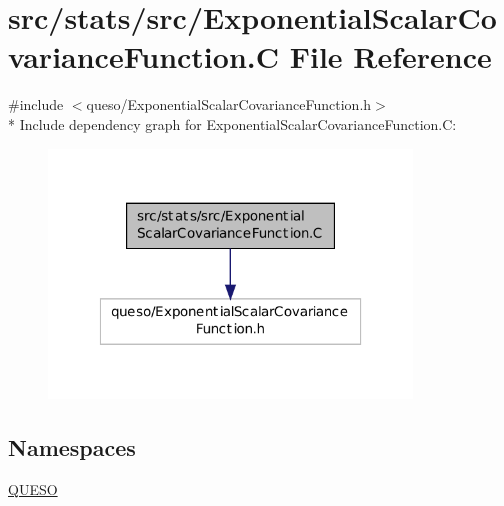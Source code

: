 \hypertarget{_exponential_scalar_covariance_function_8_c}{\section{src/stats/src/\-Exponential\-Scalar\-Covariance\-Function.C File Reference}
\label{_exponential_scalar_covariance_function_8_c}
}
{\ttfamily \#include $<$queso/\-Exponential\-Scalar\-Covariance\-Function.\-h$>$}\\*
Include dependency graph for Exponential\-Scalar\-Covariance\-Function.\-C\-:
\nopagebreak
\begin{figure}[H]
\begin{center}
\leavevmode
\includegraphics[width=274pt]{_exponential_scalar_covariance_function_8_c__incl}
\end{center}
\end{figure}
\subsection*{Namespaces}
\begin{DoxyCompactItemize}
\item 
\hyperlink{namespace_q_u_e_s_o}{Q\-U\-E\-S\-O}
\end{DoxyCompactItemize}

